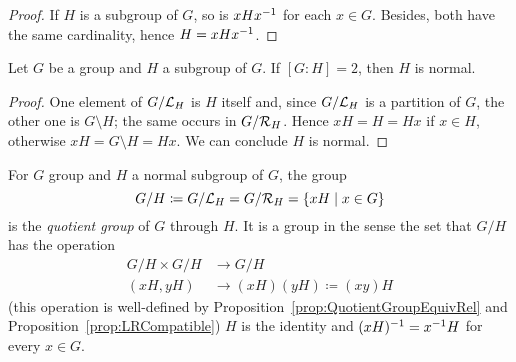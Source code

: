 \begin{proof}
If \(H\) is a subgroup of \(G\), so is \(x H x^{-1}\) for each \(x \in G\). Besides, both have the same cardinality, hence \(H = xHx^{-1}\).
\end{proof}

\begin{corollary}
Let \(G\) be a group and \(H\) a subgroup of \(G\). If \([G:H] = 2\), then \(H\) is normal.
\end{corollary}

\begin{proof}
One element of \(G/\mathcal L_H\) is \(H\) itself and, since \(G/\mathcal L_H\) is a partition of \(G\), the other one is \(G \setminus H\); the same occurs in \(G/\mathcal R_H\). Hence \(xH = H = Hx\) if \(x \in H\), otherwise \(xH = G \setminus H = Hx\). We can conclude \(H\) is normal.
\end{proof}

\begin{definition}
For \(G\) group and \(H\) a normal subgroup of \(G\), the group
\[G/H \coloneq G/\mathcal L_H = G/\mathcal R_H = \left\{xH \mid x \in G\right\}\]
is the {\em quotient group} of \(G\) through \(H\). It is a group in the sense the set that \(G/H\) has the operation
\begin{align*}
G/H \times G/H & \to G/H \\
(xH, yH) & \to (xH)(yH) \coloneq (xy)H
\end{align*}
(this operation is well-defined by Proposition~\ref{prop:QuotientGroupEquivRel} and Proposition~\ref{prop:LRCompatible}) \(H\) is the identity and \((xH)^{-1} = x^{-1} H\) for every \(x \in G\).
\end{definition}


